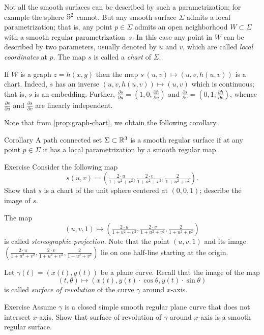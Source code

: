 Not all the smooth surfaces can be described by such a parametrization;
for example the sphere $\mathbb{S}^2$ cannot.
But any smooth surface $\Sigma$ admits a local parametrization; that is, any point $p\in\Sigma$ admits an open neighborhood $W\subset \Sigma$ with a smooth regular parametrization~$s$.
In this case any point in $W$ can be described by two parameters, usually denoted by $u$ and $v$, 
which are called \emph{local coordinates} at $p$.
The map $s$ is called a \emph{chart} of $\Sigma$.

If $W$ is a graph $z=h(x,y)$ then the map $s\:(u,v)\mapsto (u,v,h(u,v))$ is a chart.
Indeed, $s$ has an inverse $(u,v,h(u,v))\mapsto (u,v)$ which is continuous;
that is, $s$ is an embedding.
Further,
$\tfrac{\partial s}{\partial u}=(1,0,\tfrac{\partial h}{\partial u})$ and $\tfrac{\partial s}{\partial v}=(0,1,\tfrac{\partial h}{\partial v})$, whence $\tfrac{\partial s}{\partial u}$ and $\tfrac{\partial s}{\partial v}$ are linearly independent.

Note that from \ref{prop:graph-chart}, we obtain the following corollary.

\begin{thm}{Corollary}
A path connected set $\Sigma\subset \mathbb{R}^3$ is a smooth regular surface if at any point $p\in \Sigma$ it has a local parametrization by a smooth regular map.
\end{thm}


\begin{thm}{Exercise}\label{ex:inversion}
Consider the following map 
\[s(u,v)=(\tfrac{2\cdot u}{1+u^2+v^2},\tfrac{2\cdot v}{1+u^2+v^2},\tfrac{2}{1+u^2+v^2}).\]
Show that $s$ is a chart of the unit sphere centered at $(0,0,1)$; describe the image of $s$.
\end{thm}

The map 
\[(u,v,1)\mapsto (\tfrac{2\cdot u}{1+u^2+v^2},\tfrac{2\cdot v}{1+u^2+v^2},\tfrac{2}{1+u^2+v^2})\]
is called \emph{stereographic projection}. 
Note that the point $(u,v,1)$ and its image $(\tfrac{2\cdot u}{1+u^2+v^2},\tfrac{2\cdot v}{1+u^2+v^2},\tfrac{2}{1+u^2+v^2})$ lie on one half-line starting at the origin.


Let $\gamma(t)=(x(t),y(t))$ be a plane curve.
Recall that the image of the map 
\[(t,\theta)\mapsto (x(t), y(t)\cdot\cos\theta,y(t)\cdot\sin\theta)\] 
is called \emph{surface of revolution} of the curve $\gamma$ around $x$-axis.

\begin{thm}{Exercise}\label{ex:revolution}
Assume $\gamma$ is a closed simple smooth regular plane curve that does not intersect $x$-axis.
Show that surface of revolution of $\gamma$ around $x$-axis is a smooth regular surface.
\end{thm}


